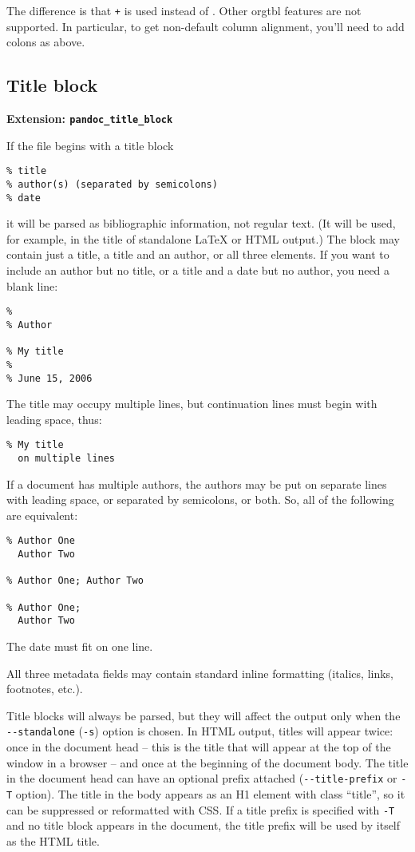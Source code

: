 \documentclass[]{article}
\begin{document}
The difference is that \texttt{+} is used instead of
\texttt{\textbar{}}. Other orgtbl features are not supported. In
particular, to get non-default column alignment, you'll need to add
colons as above.

\subsection{Title block}

\textbf{Extension: \texttt{pandoc\_title\_block}}

If the file begins with a title block

\begin{verbatim}
% title
% author(s) (separated by semicolons)
% date
\end{verbatim}

it will be parsed as bibliographic information, not regular text. (It
will be used, for example, in the title of standalone LaTeX or HTML
output.) The block may contain just a title, a title and an author, or
all three elements. If you want to include an author but no title, or a
title and a date but no author, you need a blank line:

\begin{verbatim}
%
% Author

% My title
%
% June 15, 2006
\end{verbatim}

The title may occupy multiple lines, but continuation lines must begin
with leading space, thus:

\begin{verbatim}
% My title
  on multiple lines
\end{verbatim}

If a document has multiple authors, the authors may be put on separate
lines with leading space, or separated by semicolons, or both. So, all
of the following are equivalent:

\begin{verbatim}
% Author One
  Author Two

% Author One; Author Two

% Author One;
  Author Two
\end{verbatim}

The date must fit on one line.

All three metadata fields may contain standard inline formatting
(italics, links, footnotes, etc.).

Title blocks will always be parsed, but they will affect the output only
when the \texttt{-{}-standalone} (\texttt{-s}) option is chosen. In HTML
output, titles will appear twice: once in the document head -- this is
the title that will appear at the top of the window in a browser -- and
once at the beginning of the document body. The title in the document
head can have an optional prefix attached (\texttt{-{}-title-prefix} or
\texttt{-T} option). The title in the body appears as an H1 element with
class ``title'', so it can be suppressed or reformatted with CSS. If a
title prefix is specified with \texttt{-T} and no title block appears in
the document, the title prefix will be used by itself as the HTML title.
\end{document}
